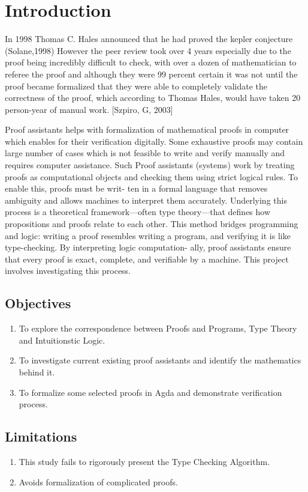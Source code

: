\documentclass[12pt]{article}
\begin{document}
\section{Introduction}

In 1998 Thomas C. Hales announced that he had proved the kepler conjecture
(Solane,1998) However the peer review took over 4 years especially due to the proof
being incredibly difficult to check, with over a dozen of mathematician to referee 
the proof and although they were 99 percent certain it was not until the proof became
formalized that they were able to completely validate the correctness of the proof,
which according to Thomas Hales, would have taken 20 person-year of manual work.
[Szpiro, G, 2003]

Proof assistants helps with formalization of mathematical proofs in computer which
enables for their verification digitally. Some exhaustive proofs may contain large
number of cases which is not feasible to write and verify manually and requires
computer assistance.
Such Proof assistants (systems) work by treating proofs as computational objects
and checking them using strict logical rules. To enable this, proofs must be writ-
ten in a formal language that removes ambiguity and allows machines to interpret
them accurately. Underlying this process is a theoretical framework—often type
theory—that defines how propositions and proofs relate to each other.
This method bridges programming and logic: writing a proof resembles writing a
program, and verifying it is like type-checking. By interpreting logic computation-
ally, proof assistants ensure that every proof is exact, complete, and verifiable by
a machine. This project involves investigating this process. 

\subsection{Objectives}
\begin{enumerate}
    \item To explore the correspondence between Proofs and Programs, Type Theory and Intuitionstic Logic.
    \item To investigate current existing proof assistants and identify the mathematics behind it.
    \item To formalize some selected proofs in Agda and demonstrate verification process.
\end{enumerate}

\subsection{Limitations}
\begin{enumerate}
    \item This study fails to rigorously present the Type Checking Algorithm.
    \item Avoids formalization of complicated proofs.
\end{enumerate}
\end{document}

